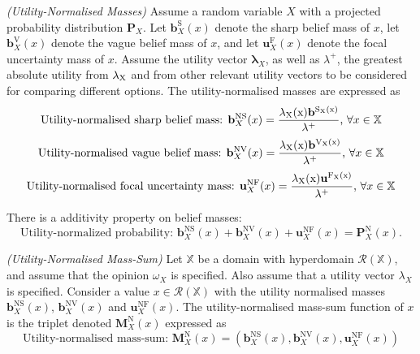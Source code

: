 \begin{definition}
    \emph{(Utility-Normalised Masses)} Assume a random variable $X$ with a
projected probability distribution $\mathbf{P}_X$. Let $\mathbf{b}^{\mathrm{S}}_X(x)$ denote the sharp belief mass of $x$, let
$\mathbf{b}^{\mathrm{V}}_X(x)$ denote the vague belief mass of $x$, and let $\mathbf{u}^{\mathrm{F}}_X(x)$ denote the focal uncertainty
mass of $x$. Assume the utility vector $\bm{\lambda}_X$, as well as $\lambda^+$, the greatest absolute utility
from $\rm{\lambda}_X$ and from other relevant utility vectors to be considered for comparing
different options. The utility-normalised masses are expressed as
    \begin{equation}
        \text{Utility-normalised sharp belief mass: } \mathbf{b}^{\mathrm{NS}}_X(x) = \dfrac{\rm{\lambda}_X(x) \mathbf{b}^{\mathrm{S}_X(x)}}{\lambda^+} \text{, } \forall x \in \mathbb{X}
    \end{equation}
    \begin{equation}
        \text{Utility-normalised vague belief mass: } \mathbf{b}^{\mathrm{NV}}_X(x) = \dfrac{\rm{\lambda}_X(x) \mathbf{b}^{\mathrm{V}_X(x)}}{\lambda^+} \text{, } \forall x \in \mathbb{X}
    \end{equation}
    \begin{equation}
        \text{Utility-normalised focal uncertainty mass: } \mathbf{u}^{\mathrm{NF}}_X(x) = \dfrac{\rm{\lambda}_X(x) \mathbf{u}^{\mathrm{F}_X(x)}}{\lambda^+} \text{, } \forall x \in \mathbb{X}
    \end{equation}
\end{definition}

There is a additivity property on belief masses:
\begin{equation}
    \text{Utility-normalized probability: } \mathbf{b}^{\mathrm{NS}}_X(x) + \mathbf{b}^{\mathrm{NV}}_X(x) + \mathbf{u}^{\mathrm{NF}}_X(x) = \mathbf{P}^{\mathrm{N}}_X(x) \text{.}
\end{equation}

\begin{definition}
    \emph{(Utility-Normalised Mass-Sum)} Let $\mathbb{X}$ be a domain with hyperdomain $\mathcal{R}(\mathbb{X})$, and assume that the opinion $\omega_X$ is specified. Also assume that a
utility vector $\lambda_X$ is specified. Consider a value $x \in \mathcal{R}(\mathbb{X})$ with the utility normalised
    masses $\mathbf{b}^{\mathrm{NS}}_X(x)$, $\mathbf{b}^{\mathrm{NV}}_X(x)$ and $\mathbf{u}^{\mathrm{NF}}_X(x)$. The utility-normalised mass-sum function of $x$
is the triplet denoted $\mathbf{M}^{\mathrm{N}}_X(x)$ expressed as
    \begin{equation}
        \text{Utility-normalised mass-sum: } \mathbf{M}^{\mathrm{N}}_X(x) = \left( \mathbf{b}^{\mathrm{NS}}_X(x), \mathbf{b}^{\mathrm{NV}}_X(x), \mathbf{u}^{\mathrm{NF}}_X(x) \right)
    \end{equation}
\end{definition}

